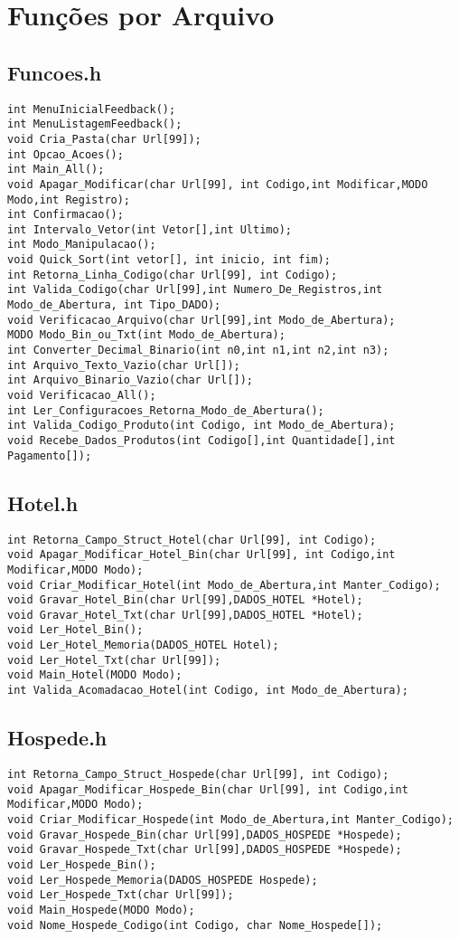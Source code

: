 \documentclass{article}
\begin{document}
  \section{Funções por Arquivo}
 

\subsection{Funcoes.h}
\begin{lstlisting}
int MenuInicialFeedback();
int MenuListagemFeedback();
void Cria_Pasta(char Url[99]);
int Opcao_Acoes();
int Main_All();
void Apagar_Modificar(char Url[99], int Codigo,int Modificar,MODO Modo,int Registro);
int Confirmacao();
int Intervalo_Vetor(int Vetor[],int Ultimo);
int Modo_Manipulacao();
void Quick_Sort(int vetor[], int inicio, int fim);
int Retorna_Linha_Codigo(char Url[99], int Codigo);
int Valida_Codigo(char Url[99],int Numero_De_Registros,int Modo_de_Abertura, int Tipo_DADO);
void Verificacao_Arquivo(char Url[99],int Modo_de_Abertura);
MODO Modo_Bin_ou_Txt(int Modo_de_Abertura);
int Converter_Decimal_Binario(int n0,int n1,int n2,int n3);
int Arquivo_Texto_Vazio(char Url[]);
int Arquivo_Binario_Vazio(char Url[]);  
void Verificacao_All();
int Ler_Configuracoes_Retorna_Modo_de_Abertura();
int Valida_Codigo_Produto(int Codigo, int Modo_de_Abertura);
void Recebe_Dados_Produtos(int Codigo[],int Quantidade[],int Pagamento[]);
\end{lstlisting}
\subsection{Hotel.h}
\begin{lstlisting}
int Retorna_Campo_Struct_Hotel(char Url[99], int Codigo);
void Apagar_Modificar_Hotel_Bin(char Url[99], int Codigo,int Modificar,MODO Modo);
void Criar_Modificar_Hotel(int Modo_de_Abertura,int Manter_Codigo);
void Gravar_Hotel_Bin(char Url[99],DADOS_HOTEL *Hotel);
void Gravar_Hotel_Txt(char Url[99],DADOS_HOTEL *Hotel);
void Ler_Hotel_Bin();
void Ler_Hotel_Memoria(DADOS_HOTEL Hotel);
void Ler_Hotel_Txt(char Url[99]);
void Main_Hotel(MODO Modo);
int Valida_Acomadacao_Hotel(int Codigo, int Modo_de_Abertura);
\end{lstlisting}
\subsection{Hospede.h}
\begin{lstlisting}
int Retorna_Campo_Struct_Hospede(char Url[99], int Codigo);
void Apagar_Modificar_Hospede_Bin(char Url[99], int Codigo,int Modificar,MODO Modo);
void Criar_Modificar_Hospede(int Modo_de_Abertura,int Manter_Codigo);
void Gravar_Hospede_Bin(char Url[99],DADOS_HOSPEDE *Hospede);
void Gravar_Hospede_Txt(char Url[99],DADOS_HOSPEDE *Hospede);
void Ler_Hospede_Bin();
void Ler_Hospede_Memoria(DADOS_HOSPEDE Hospede);
void Ler_Hospede_Txt(char Url[99]);
void Main_Hospede(MODO Modo);
void Nome_Hospede_Codigo(int Codigo, char Nome_Hospede[]);
\end{lstlisting}
\end{document}
